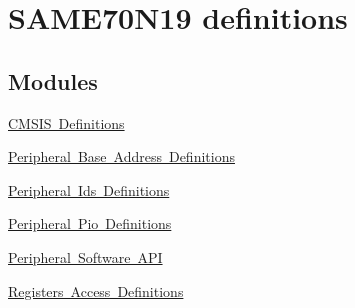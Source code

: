 \hypertarget{group__SAME70N19__definitions}{}\section{S\+A\+M\+E70\+N19 definitions}
\label{group__SAME70N19__definitions}
\subsection*{Modules}
\begin{DoxyCompactItemize}
\item 
\mbox{\hyperlink{group__SAME70N19__cmsis}{C\+M\+S\+I\+S Definitions}}
\item 
\mbox{\hyperlink{group__SAME70N19__base}{Peripheral Base Address Definitions}}
\item 
\mbox{\hyperlink{group__SAME70N19__id}{Peripheral Ids Definitions}}
\item 
\mbox{\hyperlink{group__SAME70N19__pio}{Peripheral Pio Definitions}}
\item 
\mbox{\hyperlink{group__SAME70N19__api}{Peripheral Software A\+PI}}
\item 
\mbox{\hyperlink{group__SAME70N19__reg}{Registers Access Definitions}}
\end{DoxyCompactItemize}
